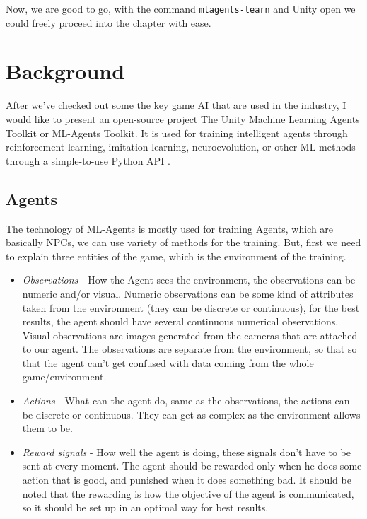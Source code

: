\documentclass[a4paper, 12pt]{book}
\begin{document}
Now, we are good to go, with the command \texttt{mlagents-learn} and Unity open we could freely proceed into the chapter with ease.

\section{Background}

After we've checked out some the key game AI that are used in the industry, I would like to present an open-source project The Unity Machine Learning Agents Toolkit or ML-Agents Toolkit. It is used for training intelligent agents through reinforcement learning, imitation learning, neuroevolution, or other ML methods through a simple-to-use Python API \cite{MLAgents}.

\subsection{Agents}

The technology of ML-Agents is mostly used for training Agents, which are basically NPCs, we can use variety of methods for the training. But, first we need to explain three entities of the game, which is the environment of the training.

\begin{itemize}
    \item \emph{Observations} - How the Agent sees the environment, the observations can be numeric and/or visual. Numeric observations can be some kind of attributes taken from the environment (they can be discrete or continuous), for the best results, the agent should have several continuous numerical observations. Visual observations are images generated from the cameras that are attached to our agent. The observations are separate from the environment, so that so that the agent can't get confused with data coming from the whole game/environment.
    \item \emph{Actions} - What can the agent do, same as the observations, the actions can be discrete or continuous. They can get as complex as the environment allows them to be.
    \item \emph{Reward signals} - How well the agent is doing, these signals don't have to be sent at every moment. The agent should be rewarded only when he does some action that is good, and punished when it does something bad. It should be noted that the rewarding is how the objective of the agent is communicated, so it should be set up in an optimal way for best results.
\end{itemize}
\end{document}
